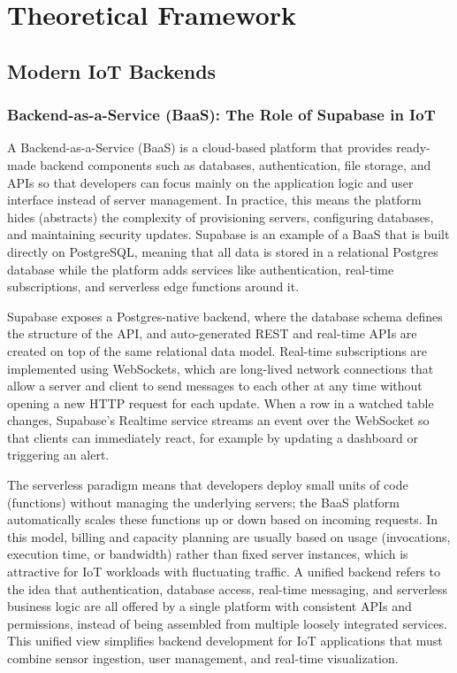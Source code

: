 \section{Theoretical Framework}

\subsection{Modern IoT Backends}

\subsubsection{Backend-as-a-Service (BaaS): The Role of Supabase in IoT}
A Backend-as-a-Service (BaaS) is a cloud-based platform that provides ready-made backend components such as databases, authentication, file storage, and APIs so that developers can focus mainly on the application logic and user interface instead of server management. In practice, this means the platform hides (abstracts) the complexity of provisioning servers, configuring databases, and maintaining security updates. Supabase is an example of a BaaS that is built directly on PostgreSQL, meaning that all data is stored in a relational Postgres database while the platform adds services like authentication, real-time subscriptions, and serverless edge functions around it.\cite{blog_elest_supabase_self_host, supabase}

Supabase exposes a Postgres-native backend, where the database schema defines the structure of the API, and auto-generated REST and real-time APIs are created on top of the same relational data model. Real-time subscriptions are implemented using WebSockets, which are long-lived network connections that allow a server and client to send messages to each other at any time without opening a new HTTP request for each update. When a row in a watched table changes, Supabase’s Realtime service streams an event over the WebSocket so that clients can immediately react, for example by updating a dashboard or triggering an alert.\cite{bejamas_serverless_supabase, supabase, blog_elest_supabase_self_host}

The serverless paradigm means that developers deploy small units of code (functions) without managing the underlying servers; the BaaS platform automatically scales these functions up or down based on incoming requests. In this model, billing and capacity planning are usually based on usage (invocations, execution time, or bandwidth) rather than fixed server instances, which is attractive for IoT workloads with fluctuating traffic. A unified backend refers to the idea that authentication, database access, real-time messaging, and serverless business logic are all offered by a single platform with consistent APIs and permissions, instead of being assembled from multiple loosely integrated services. This unified view simplifies backend development for IoT applications that must combine sensor ingestion, user management, and real-time visualization.\cite{deepwiki_supabase_core, supabase, blog_elest_supabase_self_host, bejamas_serverless_supabase}

